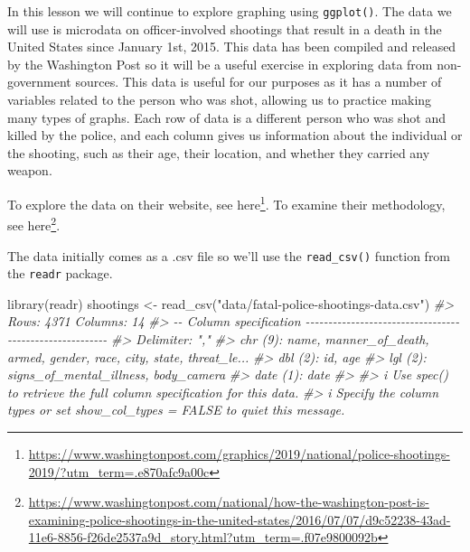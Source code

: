 \documentclass[
]{krantz}
\makeatletter
\newenvironment{Shaded}{\begin{snugshade}}{\end{snugshade}}
\newcommand{\CommentTok}[1]{\textcolor[rgb]{0.37,0.37,0.37}{\textit{#1}}}
\newcommand{\FunctionTok}[1]{\textcolor[rgb]{0,0,0}{#1}}
\newcommand{\NormalTok}[1]{#1}
\newcommand{\OtherTok}[1]{\textcolor[rgb]{0.37,0.37,0.37}{#1}}
\newcommand{\StringTok}[1]{\textcolor[rgb]{0.5,0.5,0.5}{#1}}
\renewcommand{\href}[2]{#2\footnote{\url{#1}}}
\newenvironment{kframe}{%
\medskip{}
\setlength{\fboxsep}{.8em}
 \def\at@end@of@kframe{}%
 \ifinner\ifhmode%
  \def\at@end@of@kframe{\end{minipage}}%
  \begin{minipage}{\columnwidth}%
 \fi\fi%
 \def\FrameCommand##1{\hskip\@totalleftmargin \hskip-\fboxsep
 \colorbox{shadecolor}{##1}\hskip-\fboxsep
     \hskip-\linewidth \hskip-\@totalleftmargin \hskip\columnwidth}%
 \MakeFramed {\advance\hsize-\width
   \@totalleftmargin\z@ \linewidth\hsize
   \@setminipage}}%
 {\par\unskip\endMakeFramed%
 \at@end@of@kframe}
\renewenvironment{Shaded}{\begin{kframe}}{\end{kframe}}
\makeatother
\begin{document}
In this lesson we will continue to explore graphing using \texttt{ggplot()}. The data we will use is microdata on officer-involved shootings that result in a death in the United States since January 1st, 2015. This data has been compiled and released by the Washington Post so it will be a useful exercise in exploring data from non-government sources. This data is useful for our purposes as it has a number of variables related to the person who was shot, allowing us to practice making many types of graphs. Each row of data is a different person who was shot and killed by the police, and each column gives us information about the individual or the shooting, such as their age, their location, and whether they carried any weapon.

To explore the data on their website, see \href{https://www.washingtonpost.com/graphics/2019/national/police-shootings-2019/?utm_term=.e870afc9a00c}{here}.
To examine their methodology, see \href{https://www.washingtonpost.com/national/how-the-washington-post-is-examining-police-shootings-in-the-united-states/2016/07/07/d9c52238-43ad-11e6-8856-f26de2537a9d_story.html?utm_term=.f07e9800092b}{here}.

The data initially comes as a .csv file so we'll use the \texttt{read\_csv()} function from the \texttt{readr} package.

\begin{Shaded}
\begin{Highlighting}[]
\FunctionTok{library}\NormalTok{(readr)}
\NormalTok{shootings }\OtherTok{\textless{}{-}} \FunctionTok{read\_csv}\NormalTok{(}\StringTok{"data/fatal{-}police{-}shootings{-}data.csv"}\NormalTok{)}
\CommentTok{\#\textgreater{} Rows: 4371 Columns: 14}
\CommentTok{\#\textgreater{} {-}{-} Column specification {-}{-}{-}{-}{-}{-}{-}{-}{-}{-}{-}{-}{-}{-}{-}{-}{-}{-}{-}{-}{-}{-}{-}{-}{-}{-}{-}{-}{-}{-}{-}{-}{-}{-}{-}{-}{-}{-}{-}{-}{-}{-}{-}{-}{-}{-}{-}{-}{-}{-}{-}{-}{-}{-}{-}{-}}
\CommentTok{\#\textgreater{} Delimiter: ","}
\CommentTok{\#\textgreater{} chr  (9): name, manner\_of\_death, armed, gender, race, city, state, threat\_le...}
\CommentTok{\#\textgreater{} dbl  (2): id, age}
\CommentTok{\#\textgreater{} lgl  (2): signs\_of\_mental\_illness, body\_camera}
\CommentTok{\#\textgreater{} date (1): date}
\CommentTok{\#\textgreater{} }
\CommentTok{\#\textgreater{} i Use \textasciigrave{}spec()\textasciigrave{} to retrieve the full column specification for this data.}
\CommentTok{\#\textgreater{} i Specify the column types or set \textasciigrave{}show\_col\_types = FALSE\textasciigrave{} to quiet this message.}
\end{Highlighting}
\end{Shaded}
\end{document}
